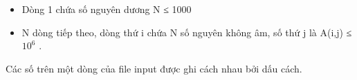 \begin{itemize}
	\item     Dòng 1 chứa số nguyên dương N ≤ 1000   
	\item     N dòng tiếp theo, dòng thứ i chứa N số nguyên không âm, số thứ j là A(i,j)         ≤ $10^{6}$     .    
\end{itemize}

   Các số trên một dòng của file input được ghi cách nhau bởi dấu cách.